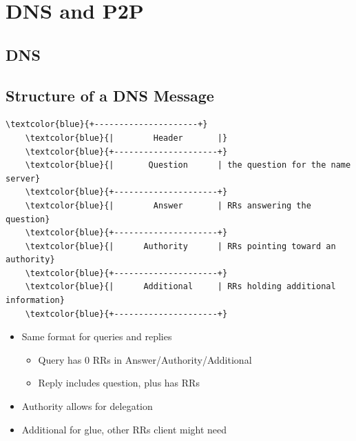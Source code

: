 \section{DNS and P2P}
\subsection{DNS}
\subsection{Structure of a DNS Message}
\begin{Verbatim}[commandchars=\\\{\}]
    \textcolor{blue}{+---------------------+}
    \textcolor{blue}{|        Header       |}
    \textcolor{blue}{+---------------------+}
    \textcolor{blue}{|       Question      | the question for the name server}
    \textcolor{blue}{+---------------------+}
    \textcolor{blue}{|        Answer       | RRs answering the question}
    \textcolor{blue}{+---------------------+}
    \textcolor{blue}{|      Authority      | RRs pointing toward an authority}
    \textcolor{blue}{+---------------------+}
    \textcolor{blue}{|      Additional     | RRs holding additional information}
    \textcolor{blue}{+---------------------+}
\end{Verbatim}
\begin{itemize}[nosep]
    \item Same format for queries and replies
          \begin{itemize}[nosep]
              \item Query has 0 RRs in Answer/Authority/Additional
              \item Reply includes question, plus has RRs
          \end{itemize}
    \item Authority allows for delegation
    \item Additional for glue, other RRs client might need
\end{itemize}
